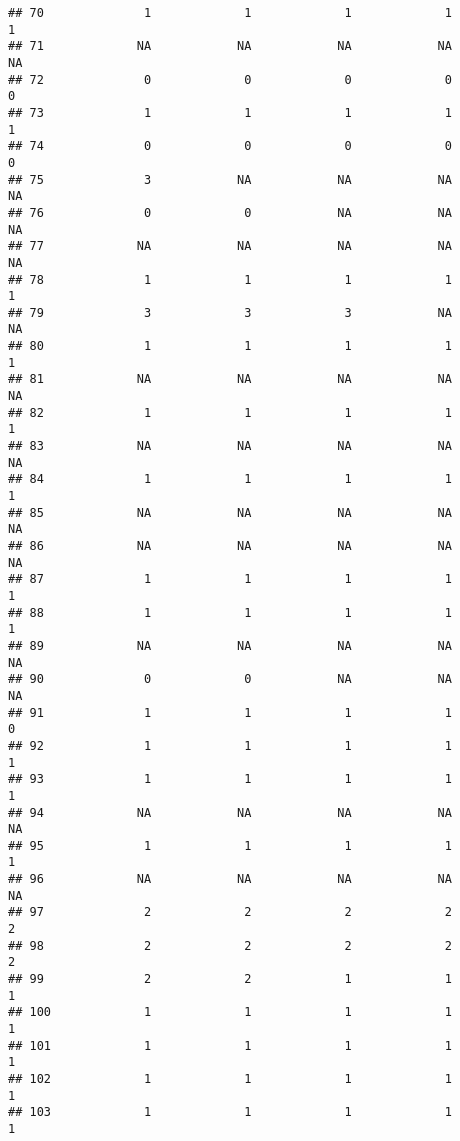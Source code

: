 \documentclass[
]{article}
\begin{document}
\begin{verbatim}
## 70              1             1             1             1             1
## 71             NA            NA            NA            NA            NA
## 72              0             0             0             0             0
## 73              1             1             1             1             1
## 74              0             0             0             0             0
## 75              3            NA            NA            NA            NA
## 76              0             0            NA            NA            NA
## 77             NA            NA            NA            NA            NA
## 78              1             1             1             1             1
## 79              3             3             3            NA            NA
## 80              1             1             1             1             1
## 81             NA            NA            NA            NA            NA
## 82              1             1             1             1             1
## 83             NA            NA            NA            NA            NA
## 84              1             1             1             1             1
## 85             NA            NA            NA            NA            NA
## 86             NA            NA            NA            NA            NA
## 87              1             1             1             1             1
## 88              1             1             1             1             1
## 89             NA            NA            NA            NA            NA
## 90              0             0            NA            NA            NA
## 91              1             1             1             1             0
## 92              1             1             1             1             1
## 93              1             1             1             1             1
## 94             NA            NA            NA            NA            NA
## 95              1             1             1             1             1
## 96             NA            NA            NA            NA            NA
## 97              2             2             2             2             2
## 98              2             2             2             2             2
## 99              2             2             1             1             1
## 100             1             1             1             1             1
## 101             1             1             1             1             1
## 102             1             1             1             1             1
## 103             1             1             1             1             1

\end{verbatim}
\end{document}
